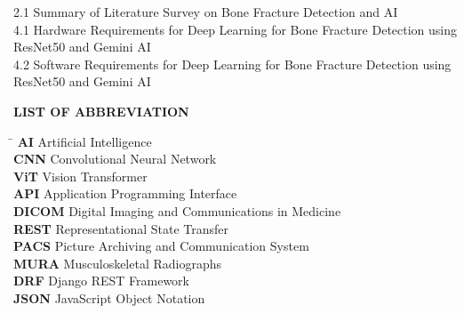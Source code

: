 \documentclass[a4paper,12pt]{report}
\begin{document}
    \vspace{0.8cm}

    2.1 \hspace{5pt} Summary of Literature Survey on Bone Fracture Detection and AI  \\
    4.1 \hspace{5pt} Hardware Requirements for Deep Learning for Bone Fracture Detection using ResNet50 and Gemini AI  \\
    4.2 \hspace{5pt} Software Requirements for Deep Learning for Bone Fracture Detection using ResNet50 and Gemini AI  \\


    \newpage
    \begin{center}
        \textbf{\LARGE LIST OF ABBREVIATION}
    \end{center}

    \vspace{1cm}

    \begin{tabbing}
    \hspace{4cm} \= \kill  %
    \textbf{AI} \> Artificial Intelligence \\[4pt]
    \textbf{CNN} \> Convolutional Neural Network \\[4pt]
    \textbf{ViT} \> Vision Transformer \\[4pt]
    \textbf{API} \> Application Programming Interface \\[4pt]
    \textbf{DICOM} \> Digital Imaging and Communications in Medicine \\[4pt]
    \textbf{REST} \> Representational State Transfer \\[4pt]
    \textbf{PACS} \> Picture Archiving and Communication System \\[4pt]
    \textbf{MURA} \> Musculoskeletal Radiographs \\[4pt]
    \textbf{DRF} \> Django REST Framework \\[4pt]
    \textbf{JSON} \> JavaScript Object Notation \\[4pt]
    \end{tabbing}

    \newpage



    \clearpage
    \pagestyle{main}          %
\end{document}
